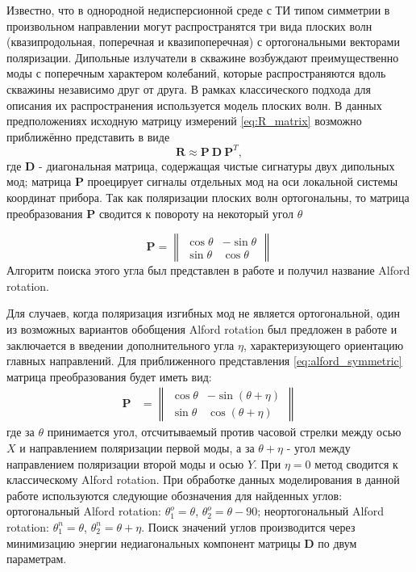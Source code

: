 \documentclass[a4paper,11pt]{article}
\begin{document}
Известно, что в однородной недисперсионной среде с ТИ типом симметрии в произвольном направлении могут распространятся три вида плоских волн (квазипродольная, поперечная и квазипоперечная) с ортогональными векторами поляризации. Дипольные излучатели в скважине возбуждают преимущественно моды с поперечным характером колебаний, которые распространяются вдоль скважины независимо друг от друга. В рамках классического подхода для описания их распространения используется модель плоских волн.  В данных предположениях исходную матрицу измерений \eqref{eq:R_matrix} возможно приближённо представить в виде \cite{Dellinger1998}
\begin{equation}
	\mathbf{R} \approx \mathbf{P} \ \mathbf{D} \ \mathbf{P}^T, \label{eq:alford_symmetric} 
\end{equation}
где $\mathbf{D}$ - диагональная матрица, содержащая чистые сигнатуры двух дипольных мод; матрица $\mathbf{P}$ проецирует сигналы отдельных мод на оси локальной системы координат прибора. Так как поляризации плоских волн ортогональны, то матрица преобразования $\mathbf{P}$ сводится к повороту на некоторый угол $\theta$

\begin{equation*}
	\mathbf{P} = \left\|
	\begin{array}{cc}
	\cos \theta &-\sin \theta \\ 
	\sin \theta & \cos \theta
	\end{array} 
	\right\| 
\end{equation*}
Алгоритм поиска этого угла был представлен в работе \cite{Alford1986} и получил название Alford rotation.

Для случаев, когда поляризация изгибных мод не является ортогональной, один из возможных вариантов обобщения Alford rotation был предложен в работе \cite{Dellinger1998} и заключается в введении дополнительного угла $\eta$, характеризующего ориентацию главных направлений. Для приближенного представления \eqref{eq:alford_symmetric} матрица преобразования будет иметь вид:
\begin{align*}
\mathbf{P} &= \left\|
\begin{array}{cc}
\cos \theta & -\sin (\theta+\eta) \\ 
\sin \theta & \cos (\theta+\eta)
\end{array} 
\right\|
\end{align*}
где за $\theta$ принимается угол, отсчитываемый против часовой стрелки между осью $X$ и направлением поляризации первой моды, а за $\theta + \eta$ - угол между направлением поляризации второй моды и осью $Y$. При $\eta=0$ метод сводится к классическому Alford rotation. При обработке данных моделирования в данной работе используются следующие обозначения для найденных углов: ортогональный Alford rotation: $\theta_1^o=\theta$, $\theta_2^o=\theta-90$; неортогональный Alford rotation: $\theta_1^n=\theta$, $\theta_2^n=\theta+\eta$. Поиск значений углов производится через минимизацию энергии недиагональных компонент матрицы $\mathbf{D}$ по двум параметрам.
\end{document}
